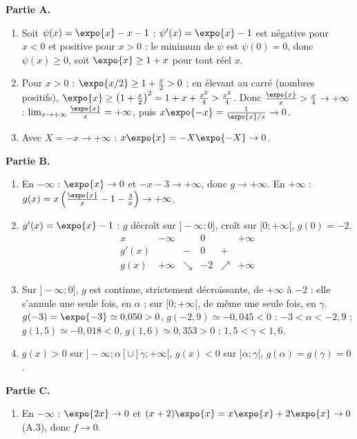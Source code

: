 \begin{corrige}
\begin{sol}
\textbf{Partie A.}
\begin{enumerate}
\item Soit $\psi(x) = \expo{x} - x - 1$ : $\psi'(x) = \expo{x} - 1$ est n\'egative pour $x < 0$ et positive pour $x > 0$ ;
      le minimum de $\psi$ est $\psi(0) = 0$, donc $\psi(x) \geq 0$, soit $\expo{x} \geq 1 + x$ pour tout r\'eel $x$.
\item Pour $x > 0$ : $\expo{x/2} \geq 1 + \frac{x}{2} > 0$ ; en \'elevant au carr\'e (nombres positifs),
      $\expo{x} \geq \left(1 + \frac{x}{2}\right)^2 = 1 + x + \frac{x^2}{4} > \frac{x^2}{4}$.
      Donc $\frac{\expo{x}}{x} > \frac{x}{4} \to +\infty$ : $\lim_{x\to+\infty}\frac{\expo{x}}{x} = +\infty$, puis
      $x\expo{-x} = \frac{1}{\expo{x}/x} \to 0$.
\item Avec $X = -x \to +\infty$ : $x\expo{x} = -X\expo{-X} \to 0$.
\end{enumerate}
\textbf{Partie B.}
\begin{enumerate}
\item En $-\infty$ : $\expo{x} \to 0$ et $-x - 3 \to +\infty$, donc $g \to +\infty$.
      En $+\infty$ : $g(x) = x\left(\frac{\expo{x}}{x} - 1 - \frac{3}{x}\right) \to +\infty$.
\item $g'(x) = \expo{x} - 1$ : $g$ d\'ecro\^it sur $]-\infty;0]$, cro\^it sur $[0;+\infty[$, $g(0) = -2$.
      \[
      \begin{array}{c|ccccc}
      x & -\infty & & 0 & & +\infty \\ \hline
      g'(x) & & - & 0 & + & \\ \hline
      g(x) & +\infty & \searrow & -2 & \nearrow & +\infty
      \end{array}
      \]
\item Sur $]-\infty;0]$, $g$ est continue, strictement d\'ecroissante, de $+\infty$ \`a $-2$ : elle s'annule une seule fois, en $\alpha$ ;
      sur $[0;+\infty[$, de m\^eme une seule fois, en $\gamma$.
      $g(-3) = \expo{-3} \simeq 0{,}050 > 0$, $g(-2{,}9) \simeq -0{,}045 < 0$ : $-3 < \alpha < -2{,}9$ ;
      $g(1{,}5) \simeq -0{,}018 < 0$, $g(1{,}6) \simeq 0{,}353 > 0$ : $1{,}5 < \gamma < 1{,}6$.
\item $g(x) > 0$ sur $]-\infty;\alpha[ \cup ]\gamma;+\infty[$, $g(x) < 0$ sur $]\alpha;\gamma[$, $g(\alpha) = g(\gamma) = 0$.
\end{enumerate}
\textbf{Partie C.}
\begin{enumerate}
\item En $-\infty$ : $\expo{2x} \to 0$ et $(x+2)\expo{x} = x\expo{x} + 2\expo{x} \to 0$ (A.3), donc $f \to 0$.

\end{enumerate}
\end{sol}
\end{corrige}
